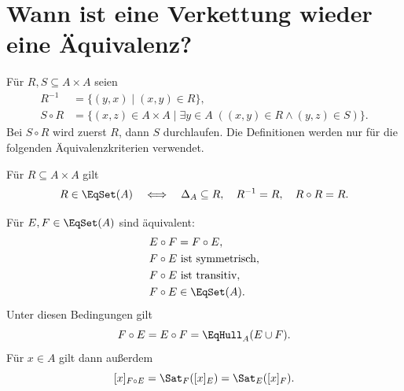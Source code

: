 \section{Wann ist eine Verkettung wieder eine Äquivalenz?}

\begin{definition}
Für $R,S\subseteq A\times A$ seien
\[
\begin{aligned}
 R^{-1}&=\{(y,x)\mid(x,y)\in R\},\\
 S\circ R&=\{(x,z)\in A\times A\mid
               \exists y\in A\;((x,y)\in R\land(y,z)\in S)\}.
\end{aligned}
\]
Bei $S\circ R$ wird zuerst $R$, dann $S$ durchlaufen.
Die Definitionen werden nur für die folgenden
Äquivalenzkriterien verwendet.
\end{definition}

\begin{theorem}
Für $R\subseteq A\times A$ gilt
\[
 R\in\EqSet(A)
 \quad\Longleftrightarrow\quad
 \Delta_A\subseteq R,\quad R^{-1}=R,\quad R\circ R=R.
\]
\end{theorem}

\begin{theorem}
\label{b11guide:thm:permuting}
Für $E,F\in\EqSet(A)$ sind äquivalent:
\[
\begin{aligned}
 &E\circ F=F\circ E,\\
 &F\circ E\text{ ist symmetrisch},\\
 &F\circ E\text{ ist transitiv},\\
 &F\circ E\in\EqSet(A).
\end{aligned}
\]
Unter diesen Bedingungen gilt
\[
 F\circ E=E\circ F=\EqHull_A(E\cup F).
\]
Für $x\in A$ gilt dann außerdem
\[
 [x]_{F\circ E}=\Sat_F([x]_E)=\Sat_E([x]_F).
\]
\end{theorem}

